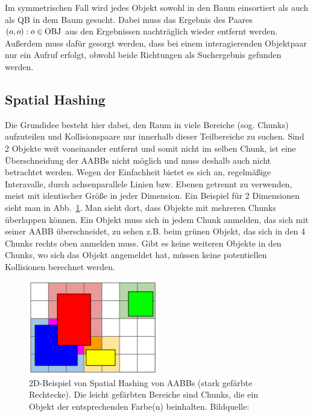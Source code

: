 
Im symmetrischen Fall wird jedes Objekt sowohl in den Baum einsortiert als auch als QB in dem Baum gesucht. Dabei muss das Ergebnis des Paares $(o, o) : o \in \operatorname{OBJ}$ aus den Ergebnissen nachträglich wieder entfernt werden. Außerdem muss dafür gesorgt werden, dass bei einem interagierenden Objektpaar nur ein Aufruf erfolgt, obwohl beide Richtungen als Suchergebnis gefunden werden.\\

\subsection{Spatial Hashing}
\label{sec:spatialHashing}
Die Grundidee besteht hier dabei, den Raum in viele Bereiche (sog. Chunks) aufzuteilen und Kollisionspaare nur innerhalb dieser Teilbereiche zu suchen. Sind 2 Objekte weit voneinander entfernt und somit nicht im selben Chunk, ist eine Überschneidung der AABBs nicht möglich und muss deshalb auch nicht betrachtet werden. Wegen der Einfachheit bietet es sich an, regelmäßige Interavalle, durch achsenparallele Linien bzw. Ebenen getrennt zu verwenden, meist mit identischer Größe in jeder Dimension. Ein Beispiel für 2 Dimensionen sieht man in Abb.~\ref{fig:spatialHashing}.
Man sieht dort, dass Objekte mit mehreren Chunks überlappen können. Ein Objekt muss sich in jedem Chunk anmelden, das sich mit seiner AABB überschneidet, zu sehen z.B. beim grünen Objekt, das sich in den 4 Chunks rechts oben anmelden muss. Gibt es keine weiteren Objekte in den Chunks, wo sich das Objekt angemeldet hat, müssen keine potentiellen Kollisionen berechnet werden.\\
\begin{figure}
    \centering
    \includegraphics[width=0.5\textwidth]{./res/spatialHashingAABB.png}
    \caption{2D-Beispiel von Spatial Hashing von AABBs (stark gefärbte Rechtecke). Die leicht gefärbten Bereiche sind Chunks, die ein Objekt der entsprechenden Farbe(n) beinhalten. Bildquelle: \cite{spatialHashing}}
    \label{fig:spatialHashing}
\end{figure}
